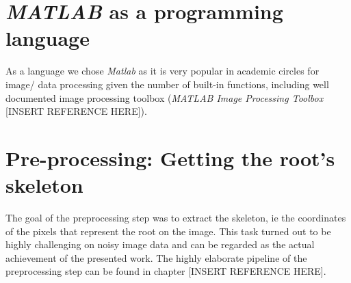 \section{\textit{MATLAB} as a programming language}

As a language we chose \textit{Matlab} as it is very popular in academic circles for image/ data processing given the number of built-in functions, including well documented image processing toolbox (\textit{MATLAB Image Processing Toolbox} [INSERT REFERENCE HERE]).


\section{Pre-processing: Getting the root's skeleton}

The goal of the preprocessing step was to extract the skeleton, ie the coordinates of the pixels that represent the root on the image.
This task turned out to be highly challenging on noisy image data and can be regarded as the actual achievement of the presented work. The highly elaborate pipeline of the preprocessing step can be found in chapter [INSERT REFERENCE HERE].




